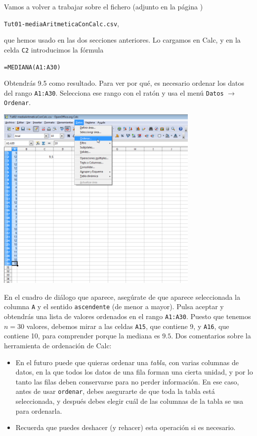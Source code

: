\documentclass[10pt,a4paper]{article}\usepackage[]{graphicx}\usepackage[]{color}
\newcounter {cont01}
\begin{document}
Vamos a volver a trabajar sobre el fichero (adjunto en la página \pageref{tut01:subsec:MediaAritmeticaCalculoDirecto})
\begin{center}
{\tt Tut01-mediaAritmeticaConCalc.csv},
\end{center}
que hemos usado en las dos secciones anteriores. Lo cargamos en Calc, y en la celda {\tt C2} introducimos la fórmula
\begin{center}
{\tt =MEDIANA(A1:A30)}
\end{center}
Obtendrás 9.5 como resultado. Para ver por qué, es necesario ordenar los datos del rango {\tt A1:A30}. Selecciona ese rango con el ratón y usa el menú {\tt Datos} $\to$ {\tt Ordenar}.
    \begin{center}
    \includegraphics[height=9cm]{../fig/Tut03-01.png}
    \end{center}
En el cuadro de diálogo que aparece, asegúrate de que aparece seleccionada la columna {\tt A} y el sentido {\tt ascendente} (de menor a mayor). Pulsa aceptar y obtendrás una lista de valores ordenados en el rango {\tt A1:A30}. Puesto que tenemos $n=30$ valores, debemos mirar a las celdas {\tt A15}, que contiene 9, y {\tt A16}, que contiene 10, para comprender porque la mediana es $9.5$. Dos comentarios sobre la herramienta de ordenación de Calc:
\begin{itemize}
  \item En el futuro puede que quieras ordenar una {\em tabla}, con varias columnas de datos, en la que todos los datos de una fila forman una cierta unidad, y por lo tanto las filas deben conservarse para no perder información. En ese caso, antes de usar {\tt ordenar}, debes asegurarte de que toda la tabla está seleccionada, y después debes elegir cuál de las columnas de la tabla se usa para ordenarla.
  \item Recuerda que puedes deshacer (y rehacer) esta operación si es necesario.
\end{itemize}
\end{document}
